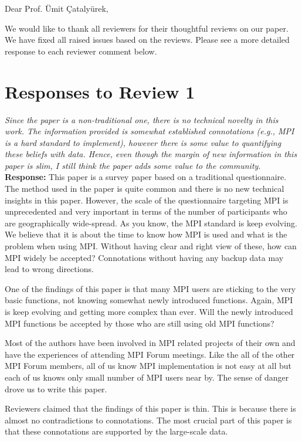 \documentclass[11pt]{article}
\newcommand{\response}[2]{{\vspace{5mm}\noindent{\bf Comment:} \em #1}\\%
  {\bf Response:} #2}
\begin{document}
\noindent
Dear Prof. \"{U}mit \c{C}ataly\"{u}rek,

\vspace{5mm}

We would like to thank all reviewers for their thoughtful reviews on our paper.
We have fixed all raised issues based on the reviews. Please see a more detailed
response to each reviewer comment below.

\section*{Responses to Review 1}

\response{
  Since the paper is a non-traditional one, there is no technical
  novelty in this work. The information provided is somewhat established
  connotations (e.g., MPI is a hard standard to implement), however
  there is some value to quantifying these beliefs with data. Hence,
  even though the margin of new information in this paper is slim, I
  still think the paper adds some value to the community.}
         {This paper is a survey paper based on a traditional
           questionnaire.  The method used in the paper is quite
           common and there is no new technical insights in this paper.
           However, the scale of the
           questionnaire targeting MPI is unprecedented and very
           important in terms of
           the number of participants who are geographically
           wide-spread. As you know, the MPI standard is keep
           evolving. We believe that it is about the time to know how
           MPI is used and what is the problem when using MPI. Without
           having clear and right view of these, how can MPI widely be accepted?
           Connotations without having any backup data may lead to
           wrong directions.

         One of the findings of this paper is that many MPI users are
         sticking to the very basic functions, not knowing somewhat
         newly introduced functions. Again, MPI is keep evolving and
         getting more complex than ever. Will the newly introduced MPI
         functions be accepted by those who are still using old MPI functions?

         Most of the authors have been
         involved in MPI related projects of their own and have
         the experiences of attending MPI Forum meetings.  Like the
         all of the other MPI Forum members, all of us
         know MPI implementation is not easy at all but
         each of us knows only small number of MPI users near by.
         The sense of danger drove us to write this paper.

         Reviewers claimed that the findings of this paper is
         thin. This is because there is almost no contradictions to
         connotations.  The most crucial part of this paper is that
         these connotations are supported by the large-scale data.}
\end{document}
